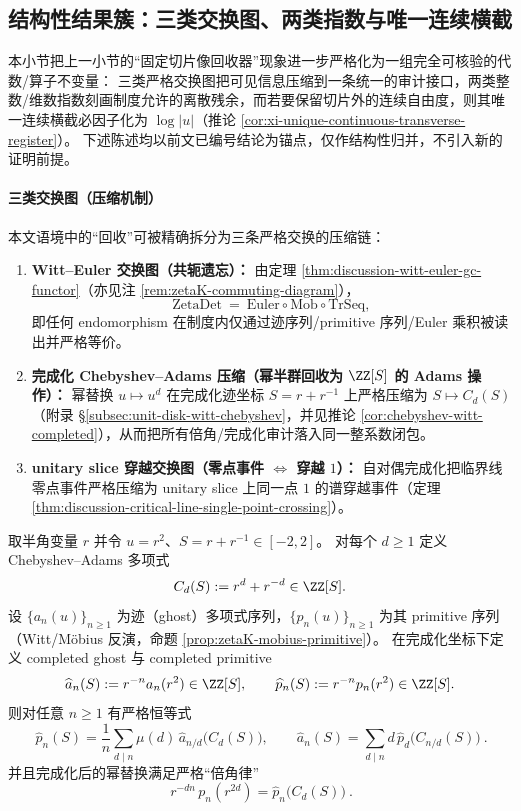 \subsection{结构性结果簇：三类交换图、两类指数与唯一连续横截}\label{subsec:discussion-gc-three-diagrams-two-indices-unique-transversal}
本小节把上一小节的“固定切片像回收器”现象进一步严格化为一组完全可核验的代数/算子不变量：
三类严格交换图把可见信息压缩到一条统一的审计接口，两类整数/维数指数刻画制度允许的离散残余，而若要保留切片外的连续自由度，则其唯一连续横截必因子化为 \(\log|u|\)（推论 \ref{cor:xi-unique-continuous-transverse-register}）。
下述陈述均以前文已编号结论为锚点，仅作结构性归并，不引入新的证明前提。

\paragraph{三类交换图（压缩机制）}
本文语境中的“回收”可被精确拆分为三条严格交换的压缩链：
\begin{enumerate}
  \item \textbf{Witt--Euler 交换图（共轭遗忘）：}
  由定理 \ref{thm:discussion-witt-euler-gc-functor}（亦见注 \ref{rem:zetaK-commuting-diagram}），
  \[
  \mathrm{ZetaDet}
  ~=~
  \mathrm{Euler}\circ\mathrm{Mob}\circ\mathrm{TrSeq},
  \]
  即任何 endomorphism 在制度内仅通过迹序列/primitive 序列/Euler 乘积被读出并严格等价。
  \item \textbf{完成化 Chebyshev--Adams 压缩（幂半群回收为 \(\ZZ[S]\) 的 Adams 操作）：}
  幂替换 \(u\mapsto u^d\) 在完成化迹坐标 \(S=r+r^{-1}\) 上严格压缩为 \(S\mapsto C_d(S)\)（附录 \S\ref{subsec:unit-disk-witt-chebyshev}，并见推论 \ref{cor:chebyshev-witt-completed}），从而把所有倍角/完成化审计落入同一整系数闭包。
  \item \textbf{unitary slice 穿越交换图（零点事件 \(\Leftrightarrow\) 穿越 \(1\)）：}
  自对偶完成化把临界线零点事件严格压缩为 unitary slice 上同一点 \(1\) 的谱穿越事件（定理 \ref{thm:discussion-critical-line-single-point-crossing}）。
\end{enumerate}

\begin{theorem}\label{thm:discussion-chebyshev-witt-equivariance}
取半角变量 \(r\) 并令 \(u=r^2\)、\(S=r+r^{-1}\in[-2,2]\)。
对每个 \(d\ge 1\) 定义 Chebyshev--Adams 多项式
\[
C_d(S):=r^d+r^{-d}\in\ZZ[S].
\]
设 \(\{a_n(u)\}_{n\ge 1}\) 为迹（ghost）多项式序列，\(\{p_n(u)\}_{n\ge 1}\) 为其 primitive 序列（Witt/Möbius 反演，命题 \ref{prop:zetaK-mobius-primitive}）。
在完成化坐标下定义 completed ghost 与 completed primitive
\[
\widehat a_n(S):=r^{-n}a_n(r^2)\in\ZZ[S],\qquad
\widehat p_n(S):=r^{-n}p_n(r^2)\in\ZZ[S].
\]
则对任意 \(n\ge 1\) 有严格恒等式
\[
\boxed{\ 
\widehat p_n(S)=\frac1n\sum_{d\mid n}\mu(d)\,\widehat a_{n/d}\!\bigl(C_d(S)\bigr),
\qquad
\widehat a_n(S)=\sum_{d\mid n}d\,\widehat p_d\!\bigl(C_{n/d}(S)\bigr)\ }.
\]
并且完成化后的幂替换满足严格“倍角律”
\[
\boxed{\ r^{-dn}\,p_n(r^{2d})=\widehat p_n\!\bigl(C_d(S)\bigr)\ }.
\]
\end{theorem}

